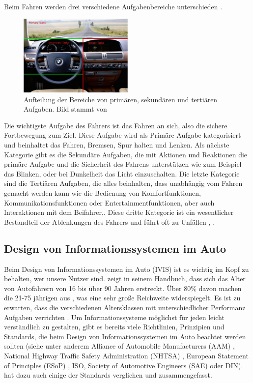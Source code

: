Beim Fahren werden drei verschiedene Aufgabenbereiche unterschieden \citep{geiser1985man}. 
\begin{figure}
	\centering
		\includegraphics[width=0.5\textwidth]{img/Fahrbereiche_Tonnis.JPG}
	\caption{Aufteilung der Bereiche von primären, sekundären und tertiären Aufgaben. Bild stammt von \citet{Tonnis:2006}}
	\label{fig:Fahrbereiche_Tonnis}
\end{figure}
Die wichtigste Aufgabe des Fahrers ist das Fahren an sich, also die sichere Fortbewegung zum Ziel. 
Diese Aufgabe wird als Primäre Aufgabe kategorisiert und beinhaltet das Fahren, Bremsen, Spur halten und Lenken. 
Als nächste Kategorie gibt es die Sekundäre Aufgaben, die mit Aktionen und Reaktionen die primäre Aufgabe und die Sicherheit des Fahrens unterstützen wie zum Beispiel das Blinken, oder bei Dunkelheit das Licht einzuschalten. 
Die letzte Kategorie sind die Tertiären Aufgaben, die alles beinhalten, dass unabhängig vom Fahren gemacht werden kann wie die Bedienung von Komfortfunktionen, Kommunikationsfunktionen oder Entertainmentfunktionen, aber auch Interaktionen mit dem Beifahrer\citep{geiser1985man},\citep{Kern:2009}. 
Diese dritte Kategorie ist ein wesentlicher Bestandteil der Ablenkungen des Fahrers und führt oft zu Unfällen \citep{neale2005overview}, \citep{rumar1988vehicle}. 

\subsection[Design von IVIS]{Design von Informationssystemen im Auto}
Beim Design von Informationssystemen im Auto (IVIS) ist es wichtig im Kopf zu behalten, wer unsere Nutzer sind. \citet{Green_2002} zeigt in seinem Handbuch, dass sich das Alter von Autofahrern von 16 bis über 90 Jahren erstreckt. 
Über 80\% davon machen die 21-75 jährigen aus \citep{Green_2002}, was eine sehr große Reichweite widerspiegelt. 
Es ist zu erwarten, dass die verschiedenen Altersklassen mit unterschiedlicher Performanz Aufgaben verrichten \citep{Green_2002}. 
Um Informationssysteme möglichst für jeden leicht verständlich zu gestalten, gibt es bereits viele Richtlinien, Prinzipien und Standards, die beim Design von Informationssystemen im Auto beachtet werden sollten (siehe unter anderem Alliance of Automobile Manufacturers (AAM) \citep{driver2006statement}, National Highway Traffic Safety Administration (NHTSA) \citep{national2012visual}, European Statement of Principles (ESoP) \citep{national2012recommandationl}, ISO, Society of Automotive Engineers (SAE) oder DIN). \citet{Green:2012:USI:2390256.2390258} hat dazu auch einige der Standards verglichen und zusammengefasst.

